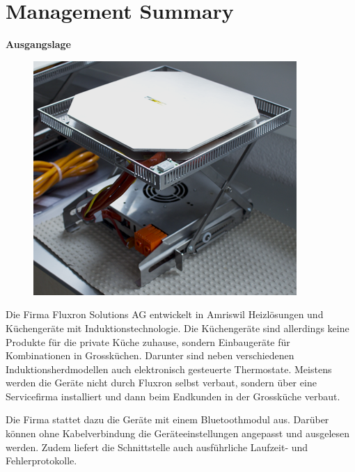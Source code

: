 \chapter*{Management Summary}

\textbf{Ausgangslage}

\begin{figure}
	\vspace{-0.5cm}
	\begin{center}
		\includegraphics[scale=1]{start/img/img_7680}
	\end{center}
	\vspace{-0.5cm}
\end{figure}

Die Firma Fluxron Solutions AG entwickelt in Amriswil Heizlösungen und Küchengeräte mit Induktionstechnologie. Die Küchengeräte sind allerdings keine Produkte für die private Küche zuhause, sondern Einbaugeräte für Kombinationen in Grossküchen. Darunter sind neben verschiedenen Induktionsherdmodellen auch elektronisch gesteuerte Thermostate. Meistens werden die Geräte nicht durch Fluxron selbst verbaut, sondern über eine Servicefirma installiert und dann beim Endkunden in der Grossküche verbaut.

Die Firma stattet dazu die Geräte mit einem Bluetoothmodul aus. Darüber können ohne Kabelverbindung die Geräteeinstellungen angepasst und ausgelesen werden. Zudem liefert die Schnittstelle auch ausführliche Laufzeit- und Fehlerprotokolle.

